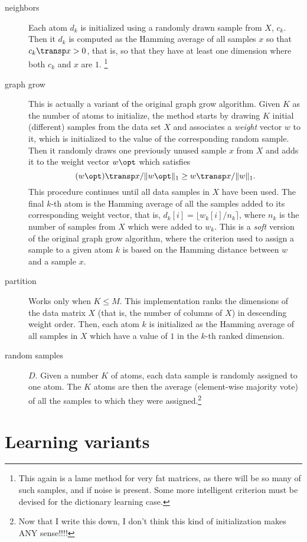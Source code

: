 \documentclass[a4paper]{IEEEtran}
\begin{document}
\begin{description}
\item[neighbors] Each atom $d_k$ is initialized using a randomly drawn sample from $X$, $c_k$. Then
  it $d_k$ is
  computed as the Hamming average of all samples $x$ so that $c_k\transp x > 0$, that is, so that
  they have at least one dimension where both $c_k$ and $x$ are $1$. \footnote{This again is a lame method for
  very fat matrices, as there will be so many of such samples, and if noise is present. Some more
  intelligent criterion must be devised for the dictionary learning case.}
\item[graph grow] This is actually a variant of the original graph grow algorithm. Given $K$ as the
  number of atoms to initialize, the method starts by drawing $K$ initial (different) samples from the
  data set $X$ and associates a \emph{weight} vector $w$ to it, which is initialized to the value of the
  corresponding random sample. Then it randomly draws one previously unused sample $x$ from $X$ and adds
  it to the weight vector $w\opt$ which satisfies
$$(w\opt)\transp x/\|w\opt\|_1 \geq
  w\transp x/\|w\|_1.$$ This procedure continues until all data samples in $X$ have been used. The final $k$-th atom is the Hamming average of all the samples added to its corresponding
  weight vector, that is, $d_k[i] = \lfloor w_k[i] / n_k \rceil$, where $n_k$ is the number of
  samples from $X$ which were added to $w_k$. This is a \emph{soft} version of the original graph grow algorithm, where the
  criterion used to assign a sample to a given atom $k$ is based on the Hamming distance between $w$
  and a sample $x$.
\item[partition] Works only when $K \leq M$. This implementation ranks the 
  dimensions of the data matrix $X$ (that is, the number of columns of $X$) in descending weight order. Then, each atom
  $k$ is initialized as the Hamming average of all samples in $X$ which have a value of $1$ in the $k$-th
  ranked dimension.
\item[random samples] $D$. Given a number $K$ of atoms, each data sample is randomly assigned to one
  atom. The $K$ atoms are then the average (element-wise majority vote) of all the samples to which
  they were assigned.\footnote{Now that I write this down, I don't think this kind of initialization makes ANY sense!!!!}
\end{description}

\section{Learning variants}
\end{document}
